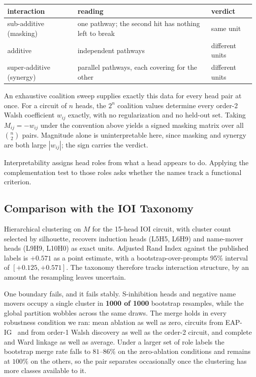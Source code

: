 \documentclass{article}
\begin{document}
\begin{center}
\begin{tabular}{lll}
\toprule
interaction & reading & verdict \\
\midrule
sub-additive (masking) & one pathway; the second hit has nothing left to break & same unit \\
additive & independent pathways & different units \\
super-additive (synergy) & parallel pathways, each covering for the other & different units \\
\bottomrule
\end{tabular}
\end{center}

An exhaustive coalition sweep supplies exactly this data for every head pair at once. For a
circuit of $n$ heads, the $2^n$ coalition values determine every order-2 Walsh coefficient
$w_{ij}$ exactly, with no regularization and no held-out set. Taking $M_{ij} = -w_{ij}$
under the convention above yields a signed masking matrix over all $\binom{n}{2}$ pairs.
Magnitude alone is uninterpretable here, since masking and synergy are both large
$|w_{ij}|$; the sign carries the verdict.

Interpretability assigns head roles from what a head appears to do. Applying the
complementation test to those roles asks whether the names track a functional criterion.

\subsection{Comparison with the IOI Taxonomy}

Hierarchical clustering on $M$ for the 15-head IOI circuit, with cluster count selected by
silhouette, recovers induction heads (L5H5, L6H9) and name-mover heads (L9H9, L10H0) as
exact units. Adjusted Rand Index against the published labels is $+0.571$ as a point
estimate, with a bootstrap-over-prompts 95\% interval of $[+0.125, +0.571]$. The taxonomy
therefore tracks interaction structure, by an amount the resampling leaves uncertain.

One boundary fails, and it fails stably. S-inhibition heads and negative name movers occupy
a single cluster in \textbf{1000 of 1000} bootstrap resamples, while the global partition
wobbles across the same draws. The merge holds in every robustness condition we ran: mean
ablation as well as zero, circuits from EAP-IG~\citep{hanna2024faith} and from order-1 Walsh
discovery as well as
the order-2 circuit, and complete and Ward linkage as well as average. Under a larger set of
role labels the bootstrap merge rate falls to $81$--$86\%$ on the zero-ablation conditions
and remains at $100\%$ on the others, so the pair separates occasionally once the clustering
has more classes available to it.
\end{document}
